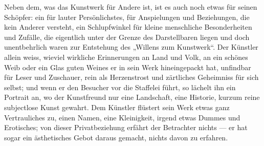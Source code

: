 Neben dem, was das Kunstwerk für Andere ist, ist es auch noch etwas für seinen Schöpfer: ein  für lauter Persönlichstes, für Anspielungen und Beziehungen, die kein Anderer versteht, ein Schlupfwinkel für kleine menschliche Besonderheiten und Zufälle, die eigentlich unter der Grenze des Darstellbaren liegen und doch unentbehrlich waren zur Entstehung des „Willens zum Kunstwerk“. Der Künstler allein weiss, wieviel wirkliche Erinnerungen an Land und Volk, an ein schönes Weib oder ein Glas guten Weines er in sein Werk hineingepackt hat, unfindbar für Leser und Zuschauer, rein als Herzenstrost und zärtliches Geheimniss für sich selbst; und wenn er den Besucher vor die Staffelei führt, so lächelt ihn ein Portrait an, wo der Kunstfreund nur eine Landschaft, eine Historie, kurzum reine subjectlose Kunst gewahrt. Dem Künstler flüstert sein Werk etwas ganz Vertrauliches zu, einen Namen, eine Kleinigkeit, irgend etwas Dummes und Erotisches; von dieser Privatbeziehung erfährt der Betrachter nichts — er hat sogar ein ästhetisches Gebot daraus gemacht, nichts davon zu erfahren.
\par

